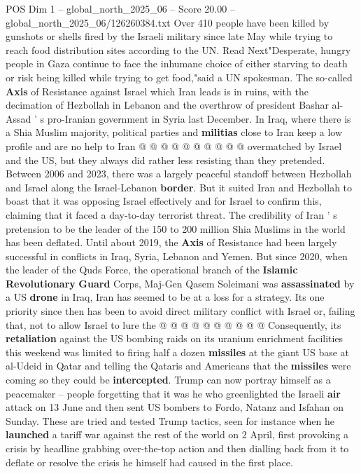 \begin{textsample}{POS Dim 1 – global\_north\_2025\_06 – Score 20.00 – global\_north\_2025\_06/126260384.txt}
Over 410 people have been killed by gunshots or shells fired by the Israeli military since late May while trying to reach food distribution sites according to the UN.
Read Next"Desperate, hungry people in Gaza continue to face the inhumane choice of either starving to death or risk being killed while trying to get food,"said a UN spokesman.
The so-called \textbf{Axis} of Resistance against Israel which Iran leads is in ruins, with the decimation of Hezbollah in Lebanon and the overthrow of president Bashar al-Assad ' s pro-Iranian government in Syria last December.
In Iraq, where there is a Shia Muslim majority, political parties and \textbf{militias} close to Iran keep a low profile and are no help to Iran @ @ @ @ @ @ @ @ @ @ overmatched by Israel and the US, but they always did rather less resisting than they pretended.
Between 2006 and 2023, there was a largely peaceful standoff between Hezbollah and Israel along the Israel-Lebanon \textbf{border}.
But it suited Iran and Hezbollah to boast that it was opposing Israel effectively and for Israel to confirm this, claiming that it faced a day-to-day terrorist threat.
The credibility of Iran ' s pretension to be the leader of the 150 to 200 million Shia Muslims in the world has been deflated.
Until about 2019, the \textbf{Axis} of Resistance had been largely successful in conflicts in Iraq, Syria, Lebanon and Yemen.
But since 2020, when the leader of the Quds Force, the operational branch of the \textbf{Islamic} \textbf{Revolutionary} \textbf{Guard} Corps, Maj-Gen Qasem Soleimani was \textbf{assassinated} by a US \textbf{drone} in Iraq, Iran has seemed to be at a loss for a strategy.
Its one priority since then has been to avoid direct military conflict with Israel or, failing that, not to allow Israel to lure the @ @ @ @ @ @ @ @ @ @ Consequently, its \textbf{retaliation} against the US bombing raids on its uranium enrichment facilities this weekend was limited to firing half a dozen \textbf{missiles} at the giant US base at al-Udeid in Qatar and telling the Qataris and Americans that the \textbf{missiles} were coming so they could be \textbf{intercepted}.
Trump can now portray himself as a peacemaker -- people forgetting that it was he who greenlighted the Israeli \textbf{air} attack on 13 June and then sent US bombers to Fordo, Natanz and Isfahan on Sunday.
These are tried and tested Trump tactics, seen for instance when he \textbf{launched} a tariff war against the rest of the world on 2 April, first provoking a crisis by headline grabbing over-the-top action and then dialling back from it to deflate or resolve the crisis he himself had caused in the first place.

\end{textsample}

